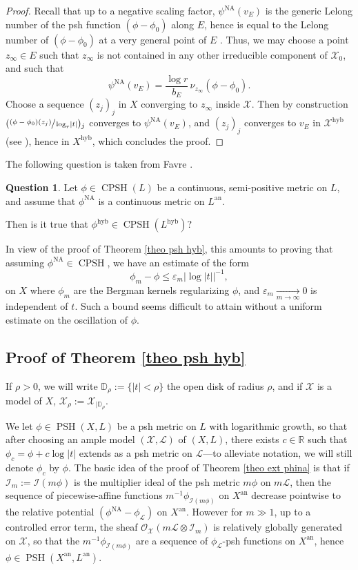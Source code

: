 \documentclass[JEP,XML,SOM,Unicode,published]{cedram}
\theoremstyle{definition}
\newtheorem{qu}[equation]{Question}
\newcommand \D {\mathbb{D}}
\newcommand \R{\mathbb R}
\newcommand \gO {\mathcal O}
\newcommand \Ld {\mathscr {L}}
\newcommand \X {\mathscr{X}}
\let\eps\varepsilon
\newcommand{\an}{\mathrm{an}}
\DeclareMathOperator{\CPSH}{CPSH}
\newcommand{\hyb}{\mathrm{hyb}}
\DeclareMathOperator{\NA}{NA}
\DeclareMathOperator{\PSH}{PSH}
\begin{document}
\begin{proof}Recall that up to a negative scaling factor, $\psi^{\NA}(v_E)$ is the generic Lelong number of the psh function $(\phi- \phi_{0})$ along $E$, hence is equal to the Lelong number of $(\phi- \phi_{0})$ at a very general point of $E$ \cite{BFJ0}. Thus, we may choose a point $z_{\infty} \in E$ such that $z_{\infty}$ is not contained in any other irreducible component of $\X_0$, and such that
\[
\psi^{\NA}(v_E) = \frac{ \log r}{b_E}\,\nu_{z_{\infty}}(\phi- \phi_{0}).
\]
Choose a sequence $(z_j)_j$ in $X$ converging to $z_{\infty}$ inside $\X$. Then by construction $(\sfrac{(\phi-\phi_{0})(z_j)}{\log_r \lvert t \rvert})_j$ converges to $\psi^{\NA}(v_E)$, and $(z_j)_j$ converges to $v_E$ in $\X^{\hyb}$ (see \cite[Def.\,2.3]{BJ}), hence in $X^{\hyb}$, which concludes the proof.
\end{proof}
The following question is taken from Favre \cite[Quest.\,1]{Fav}.
\begin{qu} Let $\phi \in \CPSH(L)$ be a continuous, semi-positive metric on $L$, and assume that $\phi^{\NA}$ is a continuous metric on $L^{\an}$.

Then is it true that $\phi^{\hyb} \in \CPSH(L^{\hyb})$?
\end{qu}
In view of the proof of Theorem \ref{theo psh hyb}, this amounts to proving that assuming $\phi^{\NA} \in \CPSH$, we have an estimate of the form
\[
\phi_m - \phi \le \eps_m \bigl\lvert \log \lvert t \rvert \bigr\rvert^{-1},
\]
on $X$ where $\phi_m$ are the Bergman kernels regularizing $\phi$, and $\eps_m \xrightarrow[m \to \infty]{} 0$ is independent of $t$. Such a bound seems difficult to attain without a uniform estimate on the oscillation of $\phi$.
\subsection{Proof of Theorem \ref{theo psh hyb}} \label{sec proof psh}
If $\rho>0$, we will write $\D_{\rho}:= \{ \lvert t \rvert < \rho \}$ the open disk of radius $\rho$, and if $\X$ is a model of $X$, $\X_{\rho}:= \X_{| \D_{\rho}}$.

We let $\phi \in \PSH(X, L)$ be a psh metric on $L$ with logarithmic growth, so that after choosing an ample model $(\X, \Ld)$ of $(X, L)$, there exists $c \in \R$ such that $\phi_c = \phi+ c \log \lvert t \rvert$ extends as a psh metric on $\Ld$---to alleviate notation, we will still denote $\phi_c$ by $\phi$.
The basic idea of the proof of Theorem \ref{theo ext phina} is that if $\mathscr{I}_m:=\mathscr{I}(m \phi)$ is the multiplier ideal of the psh metric $m \phi$ on $m\Ld$, then the sequence of piecewise-affine functions $m^{-1} \phi_{\mathscr{I}(m\phi)}$ on $X^{\an}$ decrease pointwise to the relative potential $(\phi^{\NA} -\phi_{\Ld})$ on $X^{\an}$. However for $m \gg 1$, up to a controlled error term, the sheaf $\gO_{\X}(m \Ld \otimes \mathscr{I}_m)$ is relatively globally generated on $\X$, so that the $m^{-1} \phi_{\mathscr{I}(m\phi)}$ are a sequence of $\phi_{\Ld}$-psh functions on $X^{\an}$, hence $\phi \in \PSH(X^{\an}, L^{\an})$.
\end{document}
